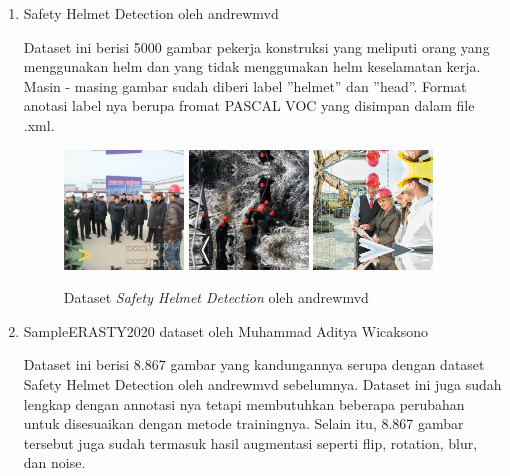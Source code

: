 \begin{enumerate}
  \item Safety Helmet Detection oleh andrewmvd
  \par Dataset ini berisi 5000 gambar pekerja konstruksi yang meliputi orang yang menggunakan helm dan yang tidak menggunakan helm keselamatan kerja. Masin - masing gambar sudah diberi label ”helmet” dan ”head”. Format anotasi label nya berupa fromat PASCAL VOC yang disimpan dalam file .xml.  

  \begin{figure}[ht]
    \centering
    \includegraphics[width=0.3\textwidth]{gambar/sample_kaggle1/hard_hat_workers0.png}
    \includegraphics[width=0.3\textwidth]{gambar/sample_kaggle1/hard_hat_workers1.png}
    \includegraphics[width=0.3\textwidth]{gambar/sample_kaggle1/hard_hat_workers19.png}
    \caption{Dataset \emph{Safety Helmet Detection} oleh andrewmvd}
    \label{fig:datasethelmetdetectionpreview}  
  \end{figure}

  \item SampleERASTY2020 dataset oleh Muhammad Aditya Wicaksono
  \par Dataset ini berisi 8.867 gambar yang kandungannya serupa dengan dataset Safety Helmet Detection oleh andrewmvd sebelumnya. Dataset ini juga sudah lengkap dengan annotasi nya tetapi membutuhkan beberapa perubahan untuk disesuaikan dengan  metode trainingnya. Selain itu, 8.867 gambar tersebut juga sudah termasuk hasil augmentasi seperti flip, rotation, blur, dan noise.


\end{enumerate}
